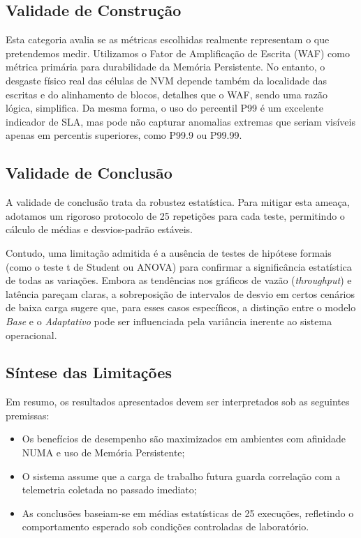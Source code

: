 \subsection*{Validade de Construção}
Esta categoria avalia se as métricas escolhidas realmente representam o que pretendemos medir. Utilizamos o Fator de Amplificação de Escrita (WAF) como métrica primária para durabilidade da Memória Persistente. No entanto, o desgaste físico real das células de NVM depende também da localidade das escritas e do alinhamento de blocos, detalhes que o WAF, sendo uma razão lógica, simplifica. Da mesma forma, o uso do percentil P99 é um excelente indicador de SLA, mas pode não capturar anomalias extremas que seriam visíveis apenas em percentis superiores, como P99.9 ou P99.99.

\subsection*{Validade de Conclusão}
A validade de conclusão trata da robustez estatística. Para mitigar esta ameaça, adotamos um rigoroso protocolo de 25 repetições para cada teste, permitindo o cálculo de médias e desvios-padrão estáveis. 

Contudo, uma limitação admitida é a ausência de testes de hipótese formais (como o teste t de Student ou ANOVA) para confirmar a significância estatística de todas as variações. Embora as tendências nos gráficos de vazão (\textit{throughput}) e latência pareçam claras, a sobreposição de intervalos de desvio em certos cenários de baixa carga sugere que, para esses casos específicos, a distinção entre o modelo \textit{Base} e o \textit{Adaptativo} pode ser influenciada pela variância inerente ao sistema operacional.

\subsection*{Síntese das Limitações}
Em resumo, os resultados apresentados devem ser interpretados sob as seguintes premissas:
\begin{itemize}
    \item Os benefícios de desempenho são maximizados em ambientes com afinidade NUMA e uso de Memória Persistente;
    \item O sistema assume que a carga de trabalho futura guarda correlação com a telemetria coletada no passado imediato;
    \item As conclusões baseiam-se em médias estatísticas de 25 execuções, refletindo o comportamento esperado sob condições controladas de laboratório.
\end{itemize}
